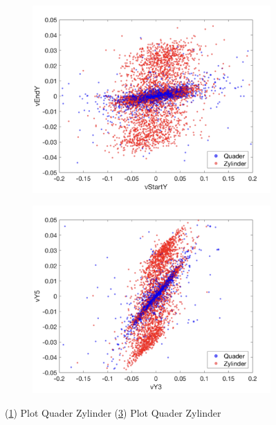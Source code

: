\begin{figure}
    \centering
    \begin{subfigure}[b]{0.45\textwidth}
        \includegraphics[width=\textwidth]{pics/Plot_Quader-Zylinder1.png}
        \caption{ }
        \label{fig:PlotQuaderZylinder1}
    \end{subfigure}
    \qquad
    \begin{subfigure}[b]{0.45\textwidth}
        \includegraphics[width=\textwidth]{pics/Plot_Quader-Zylinder2.png}
        \caption{ }
        \label{fig:PlotQuaderZylinder2}
    \end{subfigure}
    \caption{(\ref{fig:PlotQuaderZylinder1}) Plot Quader Zylinder (\ref{fig:PlotQuaderZylinder2}) Plot Quader Zylinder}
\end{figure}


